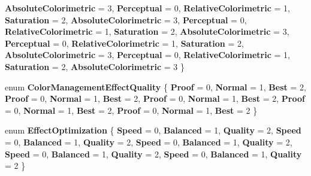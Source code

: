 \begin{DoxyCompactItemize}
{\bfseries Absolute\+Colorimetric} = 3, 
\newline
{\bfseries Perceptual} = 0, 
{\bfseries Relative\+Colorimetric} = 1, 
{\bfseries Saturation} = 2, 
{\bfseries Absolute\+Colorimetric} = 3, 
\newline
{\bfseries Perceptual} = 0, 
{\bfseries Relative\+Colorimetric} = 1, 
{\bfseries Saturation} = 2, 
{\bfseries Absolute\+Colorimetric} = 3, 
\newline
{\bfseries Perceptual} = 0, 
{\bfseries Relative\+Colorimetric} = 1, 
{\bfseries Saturation} = 2, 
{\bfseries Absolute\+Colorimetric} = 3, 
\newline
{\bfseries Perceptual} = 0, 
{\bfseries Relative\+Colorimetric} = 1, 
{\bfseries Saturation} = 2, 
{\bfseries Absolute\+Colorimetric} = 3
 \}
\item 
\mbox{\label{namespace_microsoft_1_1_graphics_1_1_canvas_1_1_effects_a7a6e53eb824ad37f9b09d4149ae14d35}} 
enum {\bfseries Color\+Management\+Effect\+Quality} \{ \newline
{\bfseries Proof} = 0, 
{\bfseries Normal} = 1, 
{\bfseries Best} = 2, 
{\bfseries Proof} = 0, 
\newline
{\bfseries Normal} = 1, 
{\bfseries Best} = 2, 
{\bfseries Proof} = 0, 
{\bfseries Normal} = 1, 
\newline
{\bfseries Best} = 2, 
{\bfseries Proof} = 0, 
{\bfseries Normal} = 1, 
{\bfseries Best} = 2, 
\newline
{\bfseries Proof} = 0, 
{\bfseries Normal} = 1, 
{\bfseries Best} = 2
 \}
\item 
\mbox{\label{namespace_microsoft_1_1_graphics_1_1_canvas_1_1_effects_abe4426b8577454af68a566839afdea96}} 
enum {\bfseries Effect\+Optimization} \{ \newline
{\bfseries Speed} = 0, 
{\bfseries Balanced} = 1, 
{\bfseries Quality} = 2, 
{\bfseries Speed} = 0, 
\newline
{\bfseries Balanced} = 1, 
{\bfseries Quality} = 2, 
{\bfseries Speed} = 0, 
{\bfseries Balanced} = 1, 
\newline
{\bfseries Quality} = 2, 
{\bfseries Speed} = 0, 
{\bfseries Balanced} = 1, 
{\bfseries Quality} = 2, 
\newline
{\bfseries Speed} = 0, 
{\bfseries Balanced} = 1, 
{\bfseries Quality} = 2
 \}
\item 
\mbox{\label{namespace_microsoft_1_1_graphics_1_1_canvas_1_1_effects_a587bd4a5e7bae1bcbe7620bbf9ac0959}} 

\end{DoxyCompactItemize}

